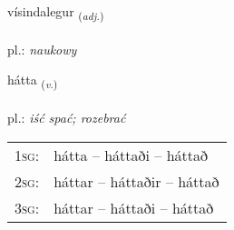 \documentclass[frontgrid, backgrid]{flacards}\usepackage[]{graphicx}\usepackage[]{xcolor}
\begin{document}
\renewcommand{\flhead}{\vskip5pt \fboxsep=0pt {\small\bfseries\footnotesize Lýsingarorð | przymiotnik}}
\renewcommand{\fcfoot}{\vskip5pt \fboxsep=0pt \hspace{2pt}{\small\bfseries\footnotesize 3K}}

\renewcommand{\blhead}{\vskip5pt {\small\bfseries\footnotesize Lýsingarorð | przymiotnik }}
\renewcommand{\bcfoot}{\vskip5pt \hspace{2pt}{\small\bfseries\footnotesize 3K}}


{vísindalegur \small{\textsubscript{(\textit{adj.})}} \\[1ex] %
\textphonetic{[viːsɪntalɛɣʏr]} \\
pl.: \emph{naukowy} \\  [2ex]
\renewcommand*{\arraystretch}{0.8}
}

\renewcommand{\flhead}{\vskip5pt \fboxsep=0pt {\small\bfseries\footnotesize Sagnorð | czasownik}}
\renewcommand{\fcfoot}{\vskip5pt \fboxsep=0pt \hspace{2pt}{\small\bfseries\footnotesize 3K}}

\renewcommand{\blhead}{\vskip5pt {\small\bfseries\footnotesize Sagnorð | czasownik }}
\renewcommand{\bcfoot}{\vskip5pt \hspace{2pt}{\small\bfseries\footnotesize 3K}}


{hátta \small{\textsubscript{(\textit{v.})}} \\[1ex] %
\textphonetic{[hauhta]} \\
pl.: \emph{iść spać; rozebrać} \\  [2ex]
\renewcommand*{\arraystretch}{0.8}
\begin{tabular}{p{1cm}l}
\textsc{1sg}: & hátta -- háttaði -- háttað \\ 
\textsc{2sg}: & háttar -- háttaðir -- háttað \\ 
\textsc{3sg}: & háttar -- háttaði -- háttað \\ 
\end{tabular}
}
\end{document}
